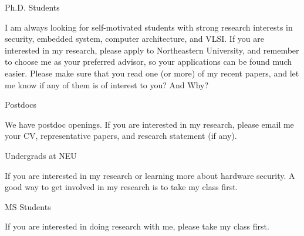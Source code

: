 Ph.D. Students

I am always looking for self-motivated students with strong research interests in security, embedded system, computer architecture, and VLSI. If you are interested in my research, please apply to Northeastern University, and remember to choose me as your preferred advisor, so your applications can be found much easier. Please make sure that you read one (or more) of my recent papers, and let me know if any of them is of interest to you? And Why?


Postdocs

We have postdoc openings. If you are interested in my research, please email me your CV, representative papers, and research statement (if any).

Undergrads at NEU

If you are interested in my research or learning more about hardware security. A good way to get involved in my research is to take my class first.

MS Students

If you are interested in doing research with me, please take my class first.